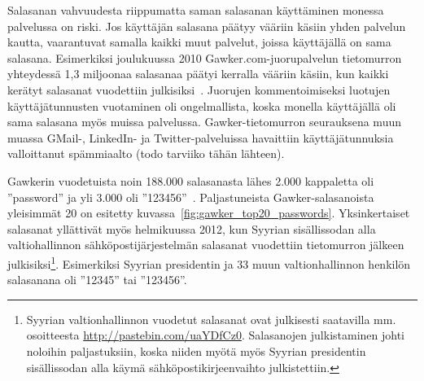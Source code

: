 \documentclass[finnish,gradu]{tktltiki}
\begin{document}
  Salasanan vahvuudesta riippumatta saman salasanan käyttäminen monessa palvelussa on riski. Jos käyttäjän salasana päätyy vääriin käsiin yhden palvelun kautta, vaarantuvat samalla kaikki muut palvelut, joissa käyttäjällä on sama salasana. Esimerkiksi joulukuussa 2010 Gawker.com-juorupalvelun tietomurron yhteydessä 1,3 miljoonaa salasanaa päätyi kerralla vääriin käsiin, kun kaikki kerätyt salasanat vuodettiin julkisiksi~\cite{bbc_gawker_12_2010, forbes_gawker_12_2010}. Juorujen kommentoimiseksi luotujen käyttäjätunnusten vuotaminen oli ongelmallista, koska monella käyttäjällä oli sama salasana myös muissa palvelussa. Gawker-tietomurron seurauksena muun muassa GMail-, LinkedIn- ja Twitter-palveluissa havaittiin käyttäjätunnuksia valloittanut spämmiaalto (todo tarviiko tähän lähteen).

   Gawkerin vuodetuista noin 188.000 salasanasta lähes 2.000 kappaletta oli ''password'' ja yli 3.000 oli  ''123456''~\cite{forbes_gawker_12_2010}. Paljastuneista Gawker-salasanoista yleisimmät 20 on esitetty kuvassa~\ref{fig:gawker_top20_passwords}. Yksinkertaiset salasanat yllättivät myös helmikuussa 2012, kun Syyrian sisällissodan alla valtiohallinnon sähköpostijärjestelmän salasanat vuodettiin tietomurron jälkeen julkisiksi\footnote{Syyrian valtionhallinnon vuodetut salasanat ovat julkisesti saatavilla mm. osoitteesta \url{http://pastebin.com/uaYDfCz0}. Salasanojen julkistaminen johti noloihin paljastuksiin, koska niiden myötä myös Syyrian presidentin sisällissodan alla käymä sähköpostikirjeenvaihto julkistettiin.}. Esimerkiksi Syyrian presidentin ja 33 muun valtionhallinnon henkilön salasanana oli ''12345'' tai ''123456''.
\end{document}
